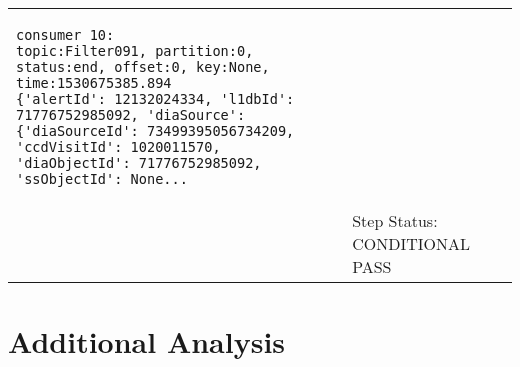 \documentclass[DM,lsstdraft,STR,toc]{lsstdoc}
\begin{document}
\begin{longtable}{p{2cm}p{14cm}}
{\begin{verbatim}
consumer 10:
topic:Filter091, partition:0, status:end, offset:0, key:None, time:1530675385.894
{'alertId': 12132024334, 'l1dbId': 71776752985092, 'diaSource': {'diaSourceId': 73499395056734209, 
'ccdVisitId': 1020011570, 'diaObjectId': 71776752985092, 'ssObjectId': None...
\end{verbatim}
}
\\\cline{2-2}
  & Step Status: CONDITIONAL PASS\\\hline
\end{longtable}





\newpage
\appendix
\section{Additional Analysis}
\end{document}
